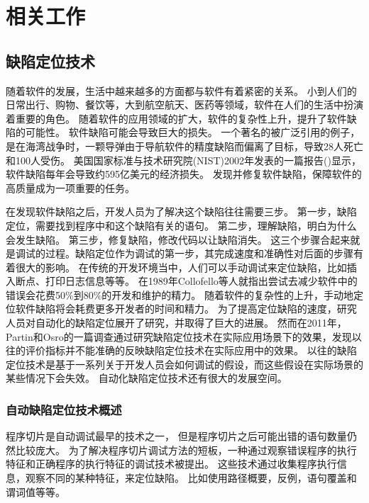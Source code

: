\chapter{相关工作}

\section{缺陷定位技术}

随着软件的发展，生活中越来越多的方面都与软件有着紧密的关系。
小到人们的日常出行、购物、餐饮等，大到航空航天、医药等领域，软件在人们的生活中扮演着重要的角色。
随着软件的应用领域的扩大，软件的复杂性上升，提升了软件缺陷的可能性。
软件缺陷可能会导致巨大的损失。
一个著名的被广泛引用的例子，是在海湾战争时，一颗导弹由于导航软件的精度缺陷而偏离了目标，导致28人死亡和100人受伤。
美国国家标准与技术研究院(NIST)2002年发表的一篇报告()显示，软件缺陷每年会导致约595亿美元的经济损失。
发现并修复软件缺陷，保障软件的高质量成为一项重要的任务。

在发现软件缺陷之后，开发人员为了解决这个缺陷往往需要三步\parencite{Parnin2011Are}。
第一步，缺陷定位，需要找到程序中和这个缺陷有关的语句。
第二步，理解缺陷，明白为什么会发生缺陷。
第三步，修复缺陷，修改代码以让缺陷消失。
这三个步骤合起来就是调试的过程。缺陷定位作为调试的第一步，其完成速度和准确性对后面的步骤有着很大的影响。
在传统的开发环境当中，人们可以手动调试来定位缺陷，比如插入断点、打印日志信息等等。
在1989年Collofello等人就指出尝试去减少软件中的错误会花费50\%到80\%的开发和维护的精力\parencite{Collofello1989Evaluating}。
随着软件的复杂性的上升，手动地定位软件缺陷将会耗费更多开发者的时间和精力。
为了提高定位缺陷的速度，研究人员对自动化的缺陷定位展开了研究，并取得了巨大的进展。
然而在2011年，Partin和Osro的一篇调查\parencite{Parnin2011Are}通过研究缺陷定位技术在实际应用场景下的效果，发现以往的评价指标并不能准确的反映缺陷定位技术在实际应用中的效果。
以往的缺陷定位技术是基于一系列关于开发人员会如何调试的假设，而这些假设在实际场景的某些情况下会失效。
自动化缺陷定位技术还有很大的发展空间。

\subsection{自动缺陷定位技术概述}

程序切片\parencite{Weiser1981Program,Weiser1984Program}是自动调试最早的技术之一，
但是程序切片之后可能出错的语句数量仍然比较庞大。
为了解决程序切片调试方法的短板，一种通过观察错误程序的执行特征和正确程序的执行特征的调试技术被提出。
这些技术通过收集程序执行信息，观察不同的某种特征，来定位缺陷。
比如使用路径概要\parencite{Reps1997The}，反例\parencite{Ball2003From,Groce2004Understanding}，语句覆盖\parencite{Jones2002Visualization}和谓词值\parencite{Liblit2005Scalable,Liu2005SOBER}等等。

